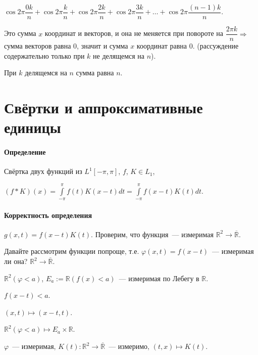 \documentclass{article}
\begin{document}
                $\cos 2 \pi \dfrac{0 k}{n} + \cos 2 \pi \dfrac{k}{n} + \cos 2 \pi \dfrac{2 k}{n} + \cos 2 \pi \dfrac{3k}{n} + \ldots + \cos 2 \pi \dfrac{(n - 1) k}{n}$.
                
                Это сумма $x$ координат и векторов, и она не меняется при повороте на $\dfrac{2 \pi k}{n} \Rightarrow $ сумма векторов равна $0$, значит и сумма $x$ координат равна $0$. (рассуждение содержательно только при $k$ не делящемся на $n$).
                
                При $k$ делящемся на $n$ сумма равна $n$.
                
\newpage

\part{Свёртки и аппроксимативные единицы}
    
    \subsection{Определение}
    
        Свёртка двух функций из $L^1 [-\pi, \pi]$, $f$, $K \in L_1$, 
        
        $(f * K)(x) = \int\limits^{\pi}_{-\pi} f(t) K(x - t) dt = \int\limits^{\pi}_{-\pi}f(x - t) K(t) dt$.
        
    \subsection{Корректность определения}
    
        $g(x, t) = f(x - t) K(t)$. Проверим, что функция~--- измеримая $\mathbb{R}^2 \rightarrow \overline{\mathbb{R}}$.
        
        Давайте рассмотрим функции попроще, т.е. $\varphi(x, t) = f(x - t)$~--- измеримая ли она? $\mathbb{R}^2 \rightarrow \overline{\mathbb{R}}$.
        
        $\mathbb{R}^2 (\varphi < a)$, $E_a := \mathbb{R} \left( f(x) < a \right)$~--- измеримая по Лебегу в $\mathbb{R}$.
        
        $f(x - t) < a$.
        
        $(x, t) \mapsto (x - t, t)$.
        
        $\mathbb{R}^2 ( \varphi < a) \mapsto E_a \times \mathbb{R}$.
        
        $\varphi$~--- измеримая, $K(t) : \mathbb{R}^2 \rightarrow \overline{\mathbb{R}}$~--- измеримо, $(t, x) \mapsto K(t)$.
        
\end{document}
